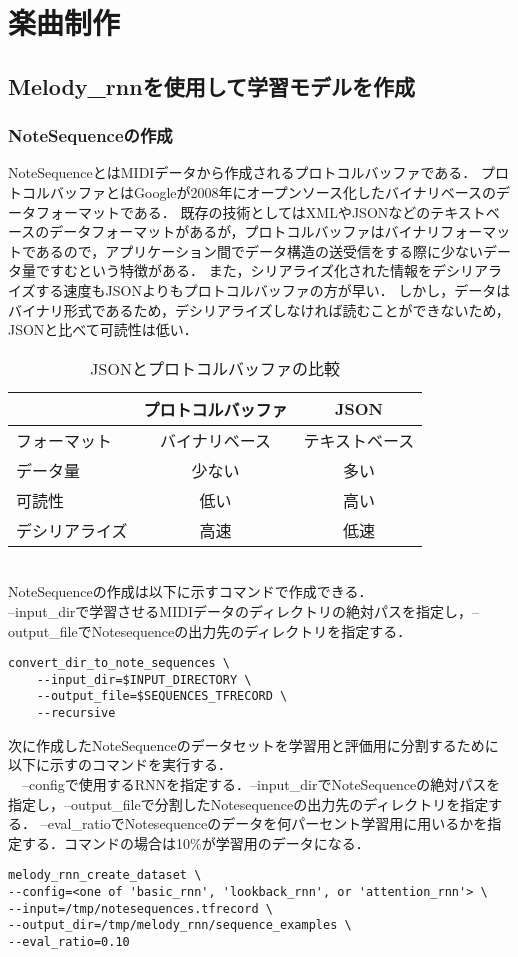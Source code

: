 \chapter{楽曲制作}
\section{Melody\_rnnを使用して学習モデルを作成}
\subsection{NoteSequenceの作成}
NoteSequenceとはMIDIデータから作成されるプロトコルバッファである．
プロトコルバッファとはGoogleが2008年にオープンソース化したバイナリベースのデータフォーマットである．
既存の技術としてはXMLやJSONなどのテキストベースのデータフォーマットがあるが，プロトコルバッファはバイナリフォーマットであるので，アプリケーション間でデータ構造の送受信をする際に少ないデータ量ですむという特徴がある．
また，シリアライズ化された情報をデシリアライズする速度もJSONよりもプロトコルバッファの方が早い．
しかし，データはバイナリ形式であるため，デシリアライズしなければ読むことができないため，JSONと比べて可読性は低い．
\begin{table}[h]
\begin{center}
\caption{JSONとプロトコルバッファの比較}
\label{tab:JSONとプロトコルバッファの比較}
\begin{tabular}{|l|c|c|}
\hline
    & プロトコルバッファ & JSON\\\hline
    \hline
    フォーマット & バイナリベース & テキストベース\\
    \hline
    データ量 & 少ない & 多い\\
    \hline
    可読性 & 低い & 高い\\
    \hline
    デシリアライズ & 高速 & 低速\\
    \hline
\end{tabular}
\end{center}
\end{table}\\
NoteSequenceの作成は以下に示すコマンドで作成できる．\\
--input\_dirで学習させるMIDIデータのディレクトリの絶対パスを指定し，--output\_fileでNotesequenceの出力先のディレクトリを指定する．
\begin{lstlisting}[basicstyle=\ttfamily\footnotesize,frame=single]
    convert_dir_to_note_sequences \
    --input_dir=$INPUT_DIRECTORY \
    --output_file=$SEQUENCES_TFRECORD \
    --recursive
\end{lstlisting}
\newpage
次に作成したNoteSequenceのデータセットを学習用と評価用に分割するために以下に示すのコマンドを実行する．\\
　--configで使用するRNNを指定する．--input\_dirでNoteSequenceの絶対パスを指定し，--output\_fileで分割したNotesequenceの出力先のディレクトリを指定する．
--eval\_ratioでNotesequenceのデータを何パーセント学習用に用いるかを指定する．コマンドの場合は10\%が学習用のデータになる．
\begin{lstlisting}[basicstyle=\ttfamily\footnotesize,frame=single]
melody_rnn_create_dataset \
--config=<one of 'basic_rnn', 'lookback_rnn', or 'attention_rnn'> \
--input=/tmp/notesequences.tfrecord \
--output_dir=/tmp/melody_rnn/sequence_examples \
--eval_ratio=0.10
\end{lstlisting}
